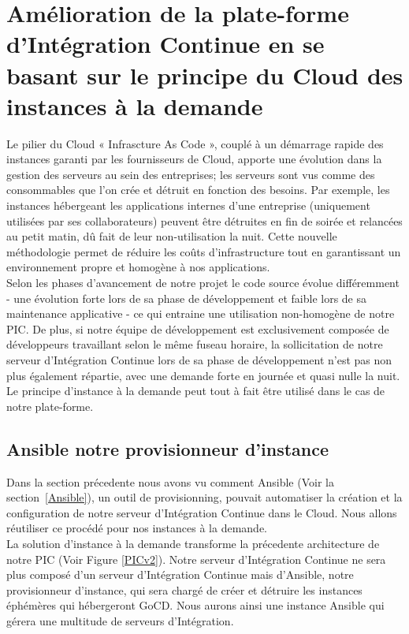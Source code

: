       \section{Amélioration de la plate-forme d'Intégration Continue en se basant sur le principe du Cloud des instances à la demande}
      Le pilier du Cloud « Infrascture As Code », couplé à un démarrage rapide des instances garanti par les fournisseurs de Cloud, apporte une évolution dans la gestion des serveurs au sein des entreprises; les serveurs sont vus comme des consommables que l'on crée et détruit en fonction des besoins. Par exemple, les instances hébergeant les applications internes d'une entreprise (uniquement utilisées par ses collaborateurs) peuvent être détruites en fin de soirée et relancées au petit matin, dû fait de leur non-utilisation la nuit. Cette nouvelle méthodologie permet de réduire les coûts d'infrastructure tout en garantissant un environnement propre et homogène à nos applications.\\

      Selon les phases d'avancement de notre projet le code source évolue différemment - une évolution forte lors de sa phase de développement et faible lors de sa maintenance applicative - ce qui entraine une utilisation non-homogène de notre PIC. De plus, si notre équipe de développement est exclusivement composée de développeurs travaillant selon le même fuseau horaire, la sollicitation de notre serveur d'Intégration Continue lors de sa phase de développement n'est pas non plus également répartie, avec une demande forte en journée et quasi nulle la nuit. Le principe d'instance à la demande peut tout à fait être utilisé dans le cas de notre plate-forme.\\

        \subsection{Ansible notre provisionneur d'instance}
        Dans la section précedente nous avons vu comment Ansible (Voir la section~\ref{Ansible}), un outil de provisionning, pouvait automatiser la création et la configuration de notre serveur d'Intégration Continue dans le Cloud. Nous allons réutiliser ce procédé pour nos instances à la demande.\\

        La solution d'instance à la demande transforme la précedente architecture de notre PIC (Voir Figure \ref{PICv2}). Notre serveur d'Intégration Continue ne sera plus composé d'un serveur d'Intégration Continue mais d'Ansible, notre provisionneur d'instance, qui sera chargé de créer et détruire les instances éphémères qui hébergeront GoCD. Nous aurons ainsi une instance Ansible qui gérera une multitude de serveurs d'Intégration.

